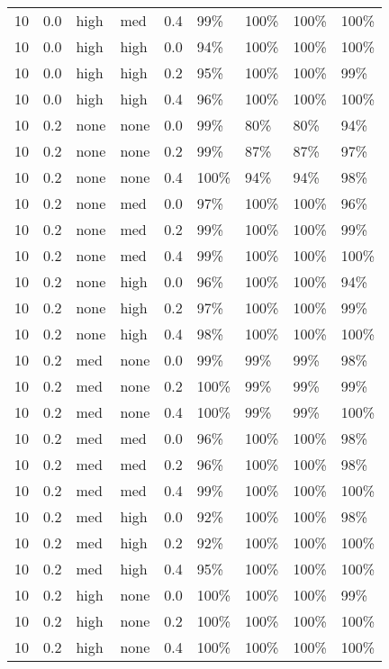 \begin{longtable}{rrllrllll}
  10 & 0.0 & high & med & 0.4 & 99\% & 100\% & 100\% & 100\% \\ 
  10 & 0.0 & high & high & 0.0 & 94\% & 100\% & 100\% & 100\% \\ 
  10 & 0.0 & high & high & 0.2 & 95\% & 100\% & 100\% & 99\% \\ 
  10 & 0.0 & high & high & 0.4 & 96\% & 100\% & 100\% & 100\% \\ 
  10 & 0.2 & none & none & 0.0 & 99\% & 80\% & 80\% & 94\% \\ 
  10 & 0.2 & none & none & 0.2 & 99\% & 87\% & 87\% & 97\% \\ 
  10 & 0.2 & none & none & 0.4 & 100\% & 94\% & 94\% & 98\% \\ 
  10 & 0.2 & none & med & 0.0 & 97\% & 100\% & 100\% & 96\% \\ 
  10 & 0.2 & none & med & 0.2 & 99\% & 100\% & 100\% & 99\% \\ 
  10 & 0.2 & none & med & 0.4 & 99\% & 100\% & 100\% & 100\% \\ 
  10 & 0.2 & none & high & 0.0 & 96\% & 100\% & 100\% & 94\% \\ 
  10 & 0.2 & none & high & 0.2 & 97\% & 100\% & 100\% & 99\% \\ 
  10 & 0.2 & none & high & 0.4 & 98\% & 100\% & 100\% & 100\% \\ 
  10 & 0.2 & med & none & 0.0 & 99\% & 99\% & 99\% & 98\% \\ 
  10 & 0.2 & med & none & 0.2 & 100\% & 99\% & 99\% & 99\% \\ 
  10 & 0.2 & med & none & 0.4 & 100\% & 99\% & 99\% & 100\% \\ 
  10 & 0.2 & med & med & 0.0 & 96\% & 100\% & 100\% & 98\% \\ 
  10 & 0.2 & med & med & 0.2 & 96\% & 100\% & 100\% & 98\% \\ 
  10 & 0.2 & med & med & 0.4 & 99\% & 100\% & 100\% & 100\% \\ 
  10 & 0.2 & med & high & 0.0 & 92\% & 100\% & 100\% & 98\% \\ 
  10 & 0.2 & med & high & 0.2 & 92\% & 100\% & 100\% & 100\% \\ 
  10 & 0.2 & med & high & 0.4 & 95\% & 100\% & 100\% & 100\% \\ 
  10 & 0.2 & high & none & 0.0 & 100\% & 100\% & 100\% & 99\% \\ 
  10 & 0.2 & high & none & 0.2 & 100\% & 100\% & 100\% & 100\% \\ 
  10 & 0.2 & high & none & 0.4 & 100\% & 100\% & 100\% & 100\% \\ 

\end{longtable}
